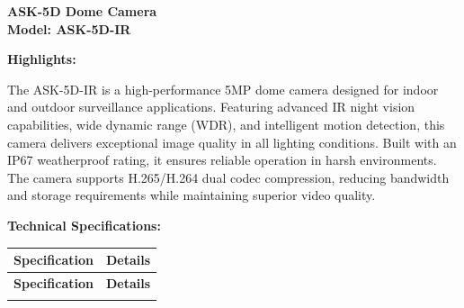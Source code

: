 \documentclass[11pt,a4paper]{article}
\newcommand{\ProductSpecPage}[4]{%
    \newpage
    \thispagestyle{fancy}
    
    \begin{center}
        \vspace*{0.5cm}
        {\Huge\bfseries #1}\\[0.3cm]
        {\Large\bfseries Model: #2}\\[0.5cm]
    \end{center}
    
    \vspace{0.3cm}
    \noindent\textbf{\large Highlights:}\\[0.2cm]
    \noindent\parbox{\textwidth}{#3}
    \vspace{0.5cm}
    
    \noindent\textbf{\large Technical Specifications:}\\[0.3cm]
    #4
    
    \vfill
}
\begin{document}
\ProductSpecPage{ASK-5D Dome Camera}{ASK-5D-IR}{%
The ASK-5D-IR is a high-performance 5MP dome camera designed for indoor and outdoor surveillance applications. Featuring advanced IR night vision capabilities, wide dynamic range (WDR), and intelligent motion detection, this camera delivers exceptional image quality in all lighting conditions. Built with an IP67 weatherproof rating, it ensures reliable operation in harsh environments. The camera supports H.265/H.264 dual codec compression, reducing bandwidth and storage requirements while maintaining superior video quality.
}{%
\begin{longtable}{@{}p{4cm}X@{}}
\toprule
\textbf{Specification} & \textbf{Details} \\
\midrule
\endfirsthead
\toprule
\textbf{Specification} & \textbf{Details} \\
\midrule
\endhead
\bottomrule
\endfoot
\bottomrule
\endlastfoot


\end{longtable}}
\end{document}
